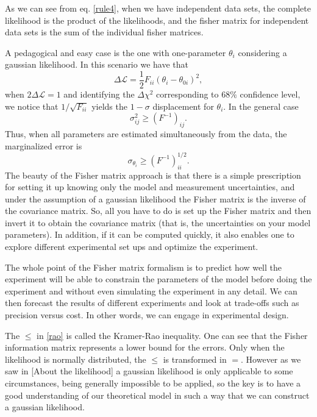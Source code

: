 \documentclass[onecolumn,           %
               showpacs,            %
               preprintnumbers,     %
               aps,                 %
               letterpaper,             %
               superscriptaddress,      %
               nofootinbib,         %
               tightenlines,        %
               floats,floatfix      %
               ,usenatbib,
               ]{revtex4-1}
\begin{document}
As we can see from eq. \eqref{rule4}, when we have independent data sets, the complete likelihood is the product of the likelihoods, and the fisher matrix for independent data sets is the sum of the individual fisher matrices. 

A pedagogical and easy case is the one with one-parameter $\theta_i$ considering a gaussian likelihood. In this scenario we have that
\begin{equation}
\Delta \mathcal{L}=\frac{1}{2}F_{ii}(\theta_i- \theta_{0i})^2,
\end{equation}
when $2\Delta\mathcal{L}=1$ and identifying the $\Delta \chi^2$ corresponding to $68\%$ confidence level, we notice that $1/\sqrt{F_{ii}}$ yields the $1-\sigma$ displacement for $\theta_i$. In the general case
\begin{equation}\label{rao}
\sigma_{ij}^2 \geq (F^{-1})_{ij}.
\end{equation}
Thus, when all parameters are estimated simultaneously from the data, the marginalized error is
\begin{equation}
\sigma_{\theta_i}\geq (F^{-1})^{1/2}_{ii}.
\end{equation}
The beauty of the Fisher matrix approach is that there is a simple prescription for setting it up knowing only the model and measurement uncertainties, and under the assumption of a gaussian likelihood the Fisher matrix is the inverse of the covariance matrix. So, all you have to do is set up the Fisher matrix and then invert it to obtain the covariance matrix (that is, the uncertainties on your model parameters). In addition, if it can be computed quickly, it also enables one to explore different experimental set ups and optimize the experiment.

The whole point of the Fisher matrix formalism is to predict how well the experiment will be able to constrain the parameters of the model before doing the experiment and without even simulating the experiment in any detail. We can then forecast the results of different experiments and look at trade-offs such as precision versus cost. In other words, we can engage in experimental design.

The $\leq$ in \eqref{rao} is called the Kramer-Rao inequality. One can see that the Fisher information matrix represents a lower bound for the errors. Only when the likelihood is normally distributed, the $\leq$ is transformed in $=$. However as we saw in [About the likelihood] a gaussian likelihood is only applicable to some circumstances, being generally impossible to be applied, so the key is to have a good understanding of our theoretical model in such a way that we can construct a gaussian likelihood.
\end{document}
